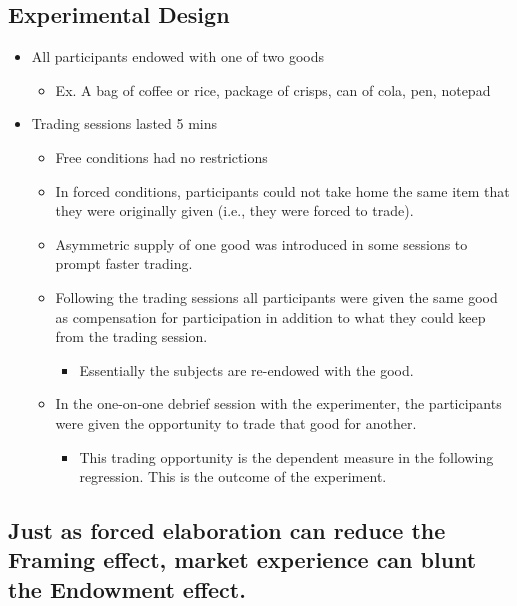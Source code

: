 \subsection{Experimental Design}
\begin{itemize}
    \item All participants endowed with one of two goods
\begin{itemize}
    \item Ex. A bag of coffee or rice, package of crisps, can of cola, pen, notepad
\end{itemize}
\item Trading sessions lasted 5 mins
\begin{itemize}
    \item Free conditions had no restrictions
\item In forced conditions, participants could not take home the same item that they were originally given (i.e., they were forced to trade). 
\item Asymmetric supply of one good was introduced in some sessions to prompt faster trading.
\item Following the trading sessions all participants were given the same good as compensation for participation in addition to what they could keep from the trading session.
\begin{itemize}
    \item Essentially the subjects are re-endowed with the good.
\end{itemize}
\item In the one-on-one debrief session with the experimenter, the participants were given the opportunity to trade that good for another.
\begin{itemize}
    \item This trading opportunity is the dependent measure in the following regression. This is the outcome of the experiment.

\end{itemize}
\end{itemize}

\end{itemize}
\subsection{Just as forced elaboration can reduce the Framing effect, market experience can blunt the Endowment effect.}
